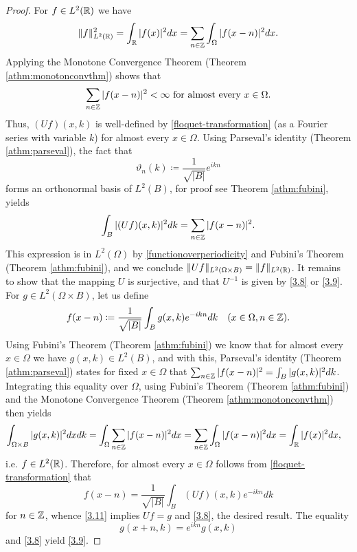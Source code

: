 \begin{theorem}
	\begin{proof}
		For $f \in L^{2}(\mathbb{R})$ we have
		\begin{equation}
			\| f \|_{L^{2}(\mathbb{R})}^{2} = \int_{\mathbb{R}} |f(x)|^{2} dx = \sum_{n \in \mathbb{Z}} \int_{\Omega} |f(x - n)|^{2} dx.\label{functionoverperiodicity}
		\end{equation} 
		Applying the Monotone Convergence Theorem (Theorem \ref{athm:monotonconvthm}) shows that
		\[ \sum_{n \in \mathbb{Z}} |f(x - n)|^{2} < \infty \text{ for almost every } x \in \Omega.\]
		Thus, $(Uf)(x, k)$ is well-defined by \eqref{floquet-transformation} (as a Fourier series with variable $k$) for almost every $x \in \Omega$. Using Parseval's identity (Theorem \ref{athm:parseval}), the fact that 
		\[ \vartheta_{n}(k) \coloneqq \frac{1}{\sqrt{|B|}} e^{ikn} \]
		forms an orthonormal basis of $L^{2}(B)$, for proof see Theorem \ref{athm:fubini}, yields
		\[ \int_{B}|(Uf)(x,k)|^{2} dk = \sum_{n \in \mathbb{Z}} |f(x - n)|^{2}. \]
	 	This expression is in $L^{2}(\Omega)$ by \eqref{functionoverperiodicity} and Fubini's Theorem (Theorem \ref{athm:fubini}), and we conclude $\| Uf \|_{L^{2}(\Omega \times B)} = \|f\|_{L^{2}(\mathbb{R})}$. It remains to show that the mapping $U$ is surjective, and that $U^{-1}$ is given by \eqref{3.8} or \eqref{3.9}. For $g \in L^{2}(\Omega \times B)$, let us define
		\begin{equation}
			f(x - n) \coloneqq \frac{1}{\sqrt{|B|}} \int_{B} g(x, k) e^{-ikn} dk \quad (x \in \Omega, n \in\mathbb{Z}).\label{3.11}
		\end{equation}
		Using Fubini's Theorem (Theorem \ref{athm:fubini}) we know that for almost every $x \in \Omega$ we have $g(x, k) \in L^{2}(B)$, and with this, Parseval's identity (Theorem \ref{athm:parseval}) states for fixed $x \in \Omega$ that $\sum_{n \in \mathbb{Z}} |f(x - n)|^{2} = \int_{B} |g(x, k)|^{2} dk$. Integrating this equality over $\Omega$, using Fubini's Theorem (Theorem \ref{athm:fubini}) and the Monotone Convergence Theorem (Theorem \ref{athm:monotonconvthm}) then yields
		\begin{align*}
			\int_{\Omega \times B} |g(x, k)|^{2} dx dk & = \int_{\Omega} \sum_{n \in \mathbb{Z}} |f(x - n)|^{2} dx  = \sum_{n \in\mathbb{Z}} \int_{\Omega} |f(x-n)|^{2} dx = \int_{\mathbb{R}} |f(x)|^{2} dx,	
		\end{align*}
		i.e. $f \in L^{2}(\mathbb{R})$. Therefore, for almost every $x \in \Omega$ follows from \eqref{floquet-transformation} that
		\[ f(x - n) = \frac{1}{\sqrt{|B|}} \int_{B} (Uf)(x,k) e^{-ikn} dk \]
		for $n \in \mathbb{Z}$, whence \eqref{3.11} implies $U f = g$ and \eqref{3.8}, the desired result. The equality  
		\[ g(x + n, k) = e^{ikn} g(x, k) \]
		and \eqref{3.8} yield \eqref{3.9}.
	\end{proof}				
\end{theorem}

